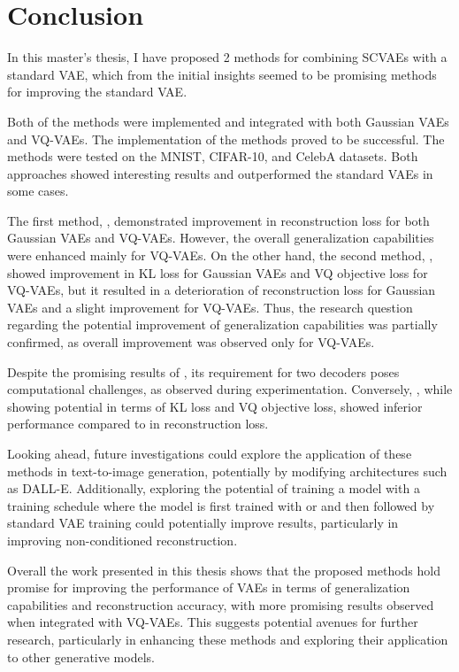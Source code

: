 \chapter{Conclusion}

In this master's thesis, I have proposed 2 methods for combining SCVAEs with a standard VAE, which from the initial insights seemed to be promising methods for improving the standard VAE.

Both of the methods were implemented and integrated with both Gaussian VAEs and VQ-VAEs. The implementation of the methods proved to be successful. The methods were tested on the MNIST, CIFAR-10, and CelebA datasets. Both approaches showed interesting results and outperformed the standard VAEs in some cases.


The first method, , demonstrated improvement in reconstruction loss for both Gaussian VAEs and VQ-VAEs. However, the overall generalization capabilities were enhanced mainly for VQ-VAEs. On the other hand, the second method, , showed improvement in KL loss for Gaussian VAEs and VQ objective loss for VQ-VAEs, but it resulted in a deterioration of reconstruction loss for Gaussian VAEs and a slight improvement for VQ-VAEs. Thus, the research question regarding the potential improvement of generalization capabilities was partially confirmed, as overall improvement was observed only for VQ-VAEs.

Despite the promising results of , its requirement for two decoders poses computational challenges, as observed during experimentation. Conversely, , while showing potential in terms of KL loss and VQ objective loss, showed inferior performance compared to  in reconstruction loss.


Looking ahead, future investigations could explore the application of these methods in text-to-image generation, potentially by modifying architectures such as DALL-E. Additionally,
exploring the potential of training a model with a training schedule where the model is first trained with  or  and then followed by standard VAE training could potentially improve results, particularly in improving non-conditioned reconstruction.

Overall the work presented in this thesis shows that the proposed methods hold promise for improving the performance of VAEs in terms of generalization capabilities and reconstruction accuracy, with more promising results observed when integrated with VQ-VAEs. This suggests potential avenues for further research, particularly in enhancing these methods and exploring their application to other generative models.



